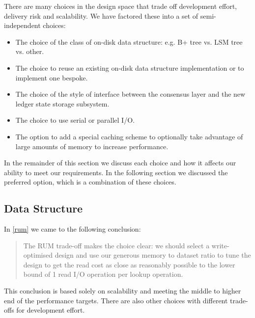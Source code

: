 \documentclass[11pt,a4paper]{article}
\begin{document}
There are many choices in the design space that trade off development effort,
delivery risk and scalability. We have factored these into a set of
semi-independent choices:
\begin{itemize}
\item The choice of the class of on-disk data structure: e.g. B+ tree vs.
      LSM tree vs. other.
\item The choice to reuse an existing on-disk data structure implementation or
      to implement one bespoke.
\item The choice of the style of interface between the consensus layer and
      the new ledger state storage subsystem.
\item The choice to use serial or parallel I/O.
\item The option to add a special caching scheme to optionally take advantage
      of large amounts of memory to increase performance.
\end{itemize}
In the remainder of this section we discuss each choice and how it affects our
ability to meet our requirements. In the following section we discussed the
preferred option, which is a combination of these choices.

\subsection{Data Structure}
\label{data-structure}

In \cref{rum} we came to the following conclusion:
\begin{quote}
The RUM trade-off makes the choice clear: we should select a write-optimised
design and use our generous memory to dataset ratio to tune the design to get
the read cost as close as reasonably possible to the lower bound of 1 read I/O
operation per {\sc lookup} operation.
\end{quote}
This conclusion is based solely on scalability and meeting the middle to higher
end of the performance targets. There are also other choices with different
trade-offs for development effort.
\end{document}
